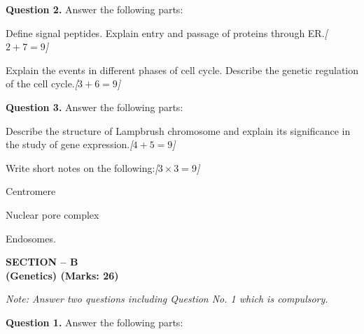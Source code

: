 \documentclass[11pt,a4paper]{article}
\newcommand{\pts}[1]{\hfill   \textit{[#1]}}
\begin{document}
\medskip


\noindent   \textbf{Question 2.} Answer the following parts:

\begin{parts}
  \item Define signal peptides. Explain entry and passage of proteins through ER.\pts{$2 + 7 = 9$}
  \item Explain the events in different phases of cell cycle. Describe the genetic regulation of the cell cycle.\pts{$3 + 6 = 9$}
\end{parts}

\medskip


\noindent   \textbf{Question 3.} Answer the following parts:

\begin{parts}
  \item Describe the structure of Lampbrush chromosome and explain its significance in the study of gene expression.\pts{$4 + 5 = 9$}
  \item Write short notes on the following:\pts{$3  \times 3 = 9$}
  
\begin{parts}
    \item Centromere
    \item Nuclear pore complex
    \item Endosomes.
  \end{parts}
\end{parts}

\pagebreak

\begin{center}
   \textbf{SECTION -- B} \\
   \textbf{(Genetics) (Marks: 26)}
\end{center}

\smallskip



\noindent   \textit{Note: Answer two questions including Question No. 1 which is compulsory.}

\medskip


\noindent   \textbf{Question 1.} Answer the following parts:
\end{document}
